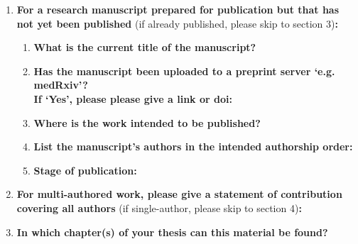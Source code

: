 {\begin{enumerate}[leftmargin=*,label={\bfseries\arabic*.}]
\begin{enumerate}[label={\alph*)}]
	No%
	\\
	If ‘No’, please seek permission from the relevant publisher and check the box next to the below statement:
	\begin{itemize}\itemsep0em
	\item[$\boxtimes$] {\itshape I acknowledge permission of the publisher named under 1d to include in this thesis portions of the publication named as included in 1c.}
	\end{itemize}
\end{enumerate}
%
\item \textbf{For a research manuscript prepared for publication but that has not yet been published} (if already published, please skip to section 3)\textbf{:}
%
\begin{enumerate}[label={\alph*)}]\itemsep0em
	\item \textbf{What is the current title of the manuscript?}
	\item \textbf{Has the manuscript been uploaded to a preprint server `e.g. medRxiv'?
	\\
	If `Yes', please please give a link or doi:}
	\item \textbf{Where is the work intended to be published?}
	\item \textbf{List the manuscript's authors in the intended authorship order:}
	\item \textbf{Stage of publication:}
\end{enumerate}

\item \textbf{For multi-authored work, please give a statement of contribution covering all authors} (if single-author, please skip to section 4)\textbf{:}
\item \textbf{In which chapter(s) of your thesis can this material be found?}


\end{enumerate}}
